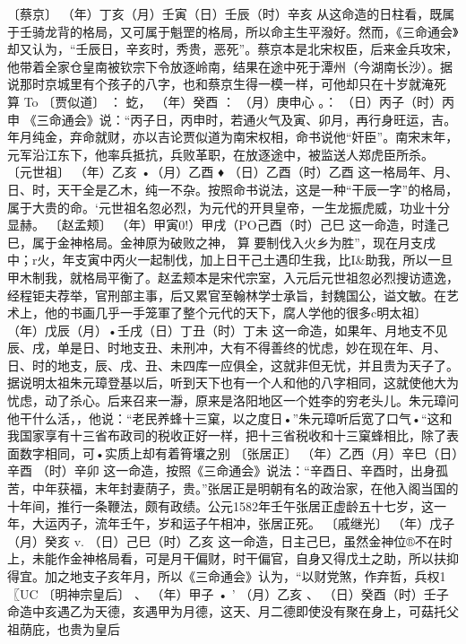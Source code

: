 {{〔蔡京〕
（年）丁亥（月）壬寅（日）壬辰（时）辛亥
从这命造的日柱看，既属于壬骑龙背的格局，又可属于魁罡的格局，所以命主生平潑好。然而，《三命通会》却又认为，“壬辰日，辛亥时，秀贵，恶死”。蔡京本是北宋权臣，后来金兵攻宋，他带着全家仓皇南被钦宗下令放逐岭南，结果在途中死于潭州（今湖南长沙）。据说那时京城里有个孩子的八字，也和蔡京生得一模一样，可他却只在十岁就淹死
算
To
〔贾似道〕	：	虼，
（年）癸酉	：
（月）庚申心	。：
（日）丙子（时）丙申
《三命通会》说：“丙子日，丙申时，若通火气及寅、卯月，再行身旺运，吉。年月纯金，弃命就财，亦以吉论贾似道为南宋权相，命书说他“奸臣”。南宋末年，元军沿江东下，他率兵抵抗，兵败革职，在放逐途中，被监送人郑虎臣所杀。
〔元世祖〕
（年）乙亥
•（月）乙酉	♦
（日）乙酉（时）乙酉
这一格局年、月、日、时，天干全是乙木，纯一不杂。按照命书说法，这是一种“干辰一字”的格局，属于大贵的命。‘元世祖名忽必烈，为元代的开貝皇帝，一生龙振虎威，功业十分显赫。
〔赵孟颊〕
（年）甲寅0!）甲戌（PO己酉（时）己巳
这一命造，时逢己巳，属于金神格局。金神原为破败之神，
算
要制伐入火乡为胜”，现在月支戌中；r火，年支寅中丙火一起制伐，加上日干己土遇印生我，比I&助我，所以一旦甲木制我，就格局平衡了。赵孟颊本是宋代宗室，入元后元世祖忽必烈搜访遗逸，经程钜夫荐举，官刑部主事，后又累官至翰林学士承旨，封魏国公，谥文敏。在艺术上，他的书画几乎一手笼軍了整个元代的天下，腐人学他的很多c明太祖〕
（年）戊辰（月）•壬戌（日）丁丑（时）丁未
这一命造，如果年、月地支不见辰、戌，单是日、时地支丑、未刑冲，大有不得善终的忧虑，妙在现在年、月、日、时的地支，辰、戌、丑、未四库一应俱全，这就非但无忧，并且贵为天子了。据说明太祖朱元璋登基以后，听到天下也有一个人和他的八字相同，这就使他大为忧虑，动了杀心。后来召来一瀞，原来是洛阳地区一个姓李的穷老头儿。朱元璋问他干什么活，，他说：“老民养蜂十三窠，以之度日•”朱元璋听后宽了口气•“这和我国家享有十三省布政司的税收正好一样，把十三省税收和十三窠蜂相比，除了表面数字相同，可•实质上却有着筲壤之别
〔张居正〕
（年）乙西（月）辛巳（日）辛酉
（时）辛卯
这一命造，按照《三命通会》说法：“辛酉日、辛酉时，出身孤苦，中年获福，末年封妻荫子，贵。”张居正是明朝有名的政治家，在他入阁当国的十年间，推行一条鞭法，颇有政绩。公元1582年壬午张居正虚龄五十七岁，这一年，大运丙子，流年壬午，岁和运子午相冲，张居正死。
〔戚继光〕
（年）戊子
（月）癸亥	v.
（日）己巳（时）乙亥
这一命造，日主己巳，虽然金神位®不在时上，未能作金神格局看，可是月干偏财，时干偏官，自身又得戊土之助，所以扶抑得宜。加之地支子亥年月，所以《三命通会》认为，“以财党煞，作弃哲，兵权1	〖UC
〔明神宗皇后〕	、
（年）甲子	•	'
（月）乙亥	、
（日）癸酉（时）壬子
命造中亥遇乙为天德，亥遇甲为月德，这天、月二德即使没有聚在身上，可菇托父祖荫庇，也贵为皇后

}}
